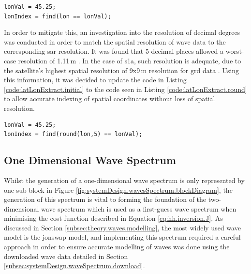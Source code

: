 \begin{lstlisting}[caption={Initial implementation of \textsc{Matlab} code to extract wave parameters at certain geographical location.},label={code:latLonExtract.initial}]
lonVal = 45.25;
lonIndex = find(lon == lonVal);
\end{lstlisting}

In order to mitigate this, an investigation into the resolution of decimal degrees was conducted in order to match the spatial resolution of wave data to the corresponding \acs{sar} resolution. It was found that 5 decimal places allowed a worst-case resolution of 1.11\,m \cite{decimalDegreesWikipedia}. In the case of \acs{s1a}, such resolution is adequate, due to the satellite's highest spatial resolution of 9x9\,m resolution for \acs{grd} data \cite{sentinel1ProductDef}. Using this information, it was decided to update the code in Listing \ref{code:latLonExtract.initial} to the code seen in Listing \ref{code:latLonExtract.round} to allow accurate indexing of spatial coordinates without loss of spatial resolution.

\begin{lstlisting}[caption={Updated implementation of \textsc{Matlab} code to extract wave parameters at certain geographical location.},label={code:latLonExtract.round}]
lonVal = 45.25;
lonIndex = find(round(lon,5) == lonVal);
\end{lstlisting}



\subsection{One Dimensional Wave Spectrum} \label{subsec:systemDesign.waveSpectrum.1DSpectrum}

Whilst the generation of a one-dimensional wave spectrum is only represented by one sub-block in Figure \ref{fig:systemDesign.wavesSpectrum.blockDiagram}, the generation of this spectrum is vital to forming the foundation of the two-dimensional wave spectrum which is used as a first-guess wave spectrum when minimising the cost function described in Equation \ref{eq:hh.inversion.J}. As discussed in Section \ref{subsec:theory.waves.modelling}, the most widely used wave model is the \acs{jonswap} model, and implementing this spectrum required a careful approach in order to ensure accurate modelling of waves was done using the downloaded wave data detailed in Section \ref{subsec:systemDesign.waveSpectrum.download}.

